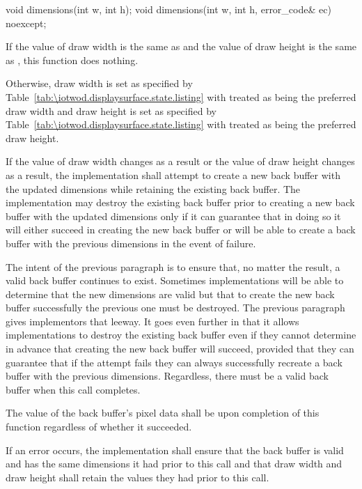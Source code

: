 %
\begin{itemdecl}
void dimensions(int w, int h);
void dimensions(int w, int h, error_code& ec) noexcept;
\end{itemdecl}
\begin{itemdescr}
\pnum
\effects
If the value of draw width is the same as  and the value of draw height is the same as , this function does nothing.

\pnum
Otherwise, draw width is set as specified by Table~\ref{tab:\iotwod.displaysurface.state.listing} with  treated as being the preferred draw width and draw height is set as specified by Table~\ref{tab:\iotwod.displaysurface.state.listing} with  treated as being the preferred draw height.

\pnum
If the value of draw width changes as a result or the value of draw height changes as a result, the implementation shall attempt to create a new back buffer with the updated dimensions while retaining the existing back buffer. The implementation may destroy the existing back buffer prior to creating a new back buffer with the updated dimensions only if it can guarantee that in doing so it will either succeed in creating the new back buffer or will be able to create a back buffer with the previous dimensions in the event of failure.

\pnum
\begin{note}
The intent of the previous paragraph is to ensure that, no matter the result, a valid back buffer continues to exist. Sometimes implementations will be able to determine that the new dimensions are valid but that to create the new back buffer successfully the previous one must be destroyed. The previous paragraph gives implementors that leeway. It goes even further in that it allows implementations to destroy the existing back buffer even if they cannot determine in advance that creating the new back buffer will succeed, provided that they can guarantee that if the attempt fails they can always successfully recreate a back buffer with the previous dimensions. Regardless, there must be a valid back buffer when this call completes.
\end{note}

\pnum
The value of the back buffer's pixel data shall be \unspecnorm upon completion of this function regardless of whether it succeeded.

\pnum
If an error occurs, the implementation shall ensure that the back buffer is valid and has the same dimensions it had prior to this call and that draw width and draw height shall retain the values they had prior to this call.


\end{itemdescr}
